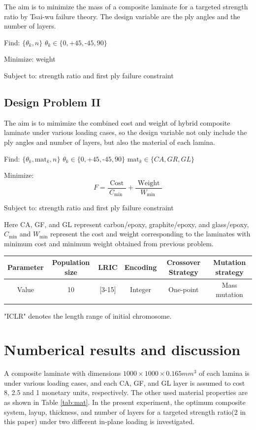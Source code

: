 \documentclass[smallextended]{svjour3}       %
\begin{document}
The aim is to minimize the mass of a composite laminate for a targeted strength
ratio by Tsai-wu failure theory. The design variable are the ply angles and the
number of layers.

Find: $\{\theta_k, n\}$ $\theta_k \in \{ 0,\text{+}45,\text{-}45,90\}$ 

Minimize: weight

Subject to: strength ratio and first ply failure constraint


\subsection{Design Problem II}
The aim is to mimimize the combined cost and weight of hybrid composite
laminate under various loading cases, so the design variable not only include
the ply angles and number of layers, but also the material of each lamina. 


Find: $\{\theta_k,\text{mat}_k, n\}$ $\theta_k \in \{ 0,\text{+}45,\text{-}45,90\}$ $\text{mat}_k \in \{CA, GR, GL \}$

Minimize: 
\begin{equation}
	F=\frac{\text { Cost }}{C_{\text {min }}}+\frac{\text { Weight }}{W_{\text {min }}}
\end{equation}

Subject to: strength ratio and first ply failure constraint


Here CA, GF, and GL represent carbon/epoxy, graphite/epoxy, and glass/epoxy,
 $C_{\text{min}}$ and $W_{\text{min}}$ represent the cost and
weight corresponding to the laminates with minimum cost and minimum weight
obtained from previous problem.
\begin{center}
\begin{tabular}{cccccc}
	\toprule
	Parameter &  Population size & LRIC & Encoding &  Crossover Strategy& Mutation strategy\\
	\midrule
	Value     & 10               & [3-15]& Integer  &  One-point &Mass mutation   \\
	\bottomrule
	\label{tab:ga}
\end{tabular}
\begin{tablenotes}\footnotesize
     "ICLR" denotes the length range of initial chromosome.
\end{tablenotes}
\end{center}


\section{Numberical results and discussion}
A composite laminate with dimensions $1000 \times 1000 \times 0.165 mm^3$ of
each lamina is under various loading cases, and each CA, GF, and GL layer is
assumed to cost 8, 2.5 and 1 monetary units, respectively.  The other used
material properties are as shown in Table \ref{tab:mat}.  In the present
experiment,  the optimum composite system, layup, thickness, and number of
layers for a targeted strength ratio(2 in this paper) under two different
in-plane loading is investigated.
\end{document}
